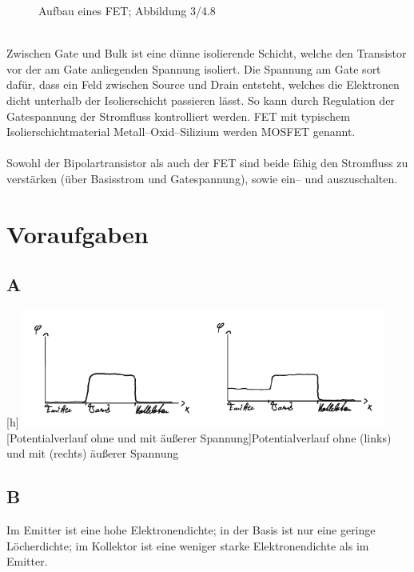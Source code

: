 \documentclass[10pt]{article}
\newenvironment{Figure}
  {\par\medskip\noindent\minipage{\linewidth}}
  {\endminipage\par\medskip}
\begin{document}
\begin{multicols}{2}
\begin{figure}[h]
		\caption{Aufbau eines FET; Abbildung 3/4.8 \cite{Praktikumsanleitung}}
	\end{figure}\\
	Zwischen Gate und Bulk ist eine dünne isolierende Schicht, welche den Transistor vor der am Gate anliegenden Spannung isoliert.
	Die Spannung am Gate sort dafür, dass ein Feld zwischen Source und Drain entsteht, welches die Elektronen dicht unterhalb der Isolierschicht passieren lässt.
	So kann durch Regulation der Gatespannung der Stromfluss kontrolliert werden.
	FET mit typischem Isolierschichtmaterial Metall--Oxid--Silizium werden MOSFET genannt.
	\\\\ Sowohl der Bipolartransistor als auch der FET sind beide fähig den Stromfluss zu verstärken (über Basisstrom und Gatespannung), sowie ein-- und auszuschalten.

	\section{Voraufgaben}
	\subsection{A}
	\begin{Figure}[h]
		\centering
		\includegraphics[width=0.9\textwidth]{A_crop.pdf}
		[Potentialverlauf ohne und mit äußerer Spannung]{Potentialverlauf ohne (links) und mit (rechts) äußerer Spannung}
	\end{Figure}

	\subsection{B}
	Im Emitter ist eine hohe Elektronendichte; in der Basis ist nur eine geringe Löcherdichte; im Kollektor ist eine weniger starke Elektronendichte als im Emitter.


\end{multicols}
\end{document}
